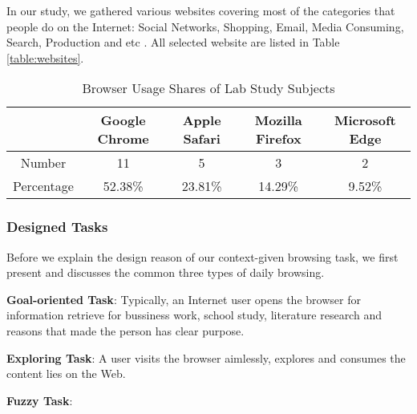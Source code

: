 In our study, we gathered various websites covering most of the categories that people do
on the Internet: Social Networks, Shopping, Email, Media Consuming, Search, Production 
and etc \cite{lori2018internet, lori2017internet}. All selected website are listed 
in Table \ref{table:websites}.

\begin{table}[H]
    \small
    \centering
    \setlength{\belowcaptionskip}{10pt}
    \caption{Browser Usage Shares of Lab Study Subjects}
    \begin{tabular}{ccccc}
          \toprule
        & \textbf{Google Chrome} & \textbf{Apple Safari} & \textbf{Mozilla Firefox} & \textbf{Microsoft Edge} \\
          \hline
          Number     & 11 & 5 & 3 & 2 \\
          Percentage & 52.38\% & 23.81\% & 14.29\% & 9.52\% \\
          \bottomrule
    \end{tabular}
    \label{table:sharesubjects}
\end{table}

\subsubsection{Designed Tasks}
\label{sec:select-tasks}

Before we explain the design reason of our context-given browsing task, we first present
and discusses the common three types of daily browsing.

\textbf{Goal-oriented Task}: Typically, an Internet user opens the browser for information retrieve
for bussiness work, school study, literature research and reasons that made the person has
clear purpose.

\textbf{Exploring Task}: A user visits the browser aimlessly, explores and consumes the content
lies on the Web.

\textbf{Fuzzy Task}: 

\cleardoublepage